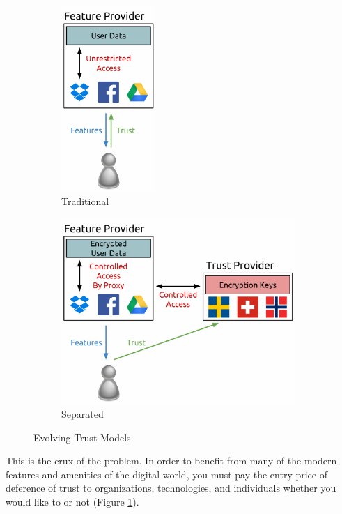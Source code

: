 \begin{figure}[!tb]
  \begin{center}
    \begin{subfigure}{.32\textwidth}
      \begin{center}
        \includegraphics[height=200pt]{./figs/pdf/TrustModel-Traditional.pdf}
        \caption{Traditional}
        \label{fig:trust-traditional}
      \end{center}
    \end{subfigure}
    \begin{subfigure}{.65\textwidth}
      \begin{center}
        \includegraphics[height=200pt]{./figs/pdf/TrustModel-Seperated.pdf}
        \caption{Separated}
        \label{fig:trust-seperated}
      \end{center}
    \end{subfigure}
  \end{center}
  \caption{Evolving Trust Models}
  \label{fig:trust}
\end{figure}

This is the crux of the problem. In order to benefit from many of the
modern features and amenities of the digital world, you must pay the
entry price of deference of trust to organizations, technologies, and
individuals whether you would like to or not (Figure
\ref{fig:trust-traditional}).

